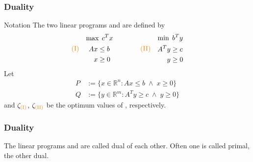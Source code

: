 
\begin{frame}
    \frametitle{Duality}
    \begin{block}{Notation}
        The two linear programs \text{\textcolor{orange}{(I)}} and \text{\textcolor{orange}{(II)}} are defined by
        \begin{equation*}
            \text{\textcolor{orange}{(I)}} \quad
            \begin{gathered}
                \max \; c^T x \\
                \begin{aligned}
                    Ax & \leq b \\
                    x & \geq 0
                \end{aligned}
            \end{gathered}
            \qquad \qquad
            \text{\textcolor{orange}{(II)}} \quad
            \begin{gathered}
                \min \; b^T y \\
                \begin{aligned}
                    A^T y & \geq c \\
                    y & \geq 0
                \end{aligned}
            \end{gathered}
        \end{equation*}
        Let
        \begin{align*}
            P & := \{x \in \mathbb{R}^n: Ax \leq b \; \land \; x \geq 0 \} \\
            Q & := \{y \in \mathbb{R}^m: A^T y \geq c \; \land \; y \geq 0 \}
        \end{align*}
        and $\zeta_{\text{\textcolor{orange}{(I)}}}$, $\zeta_{\text{\textcolor{orange}{(II)}}}$ be the optimum values of \text{\textcolor{orange}{(I)}}, \text{\textcolor{orange}{(II)}} respectively.
    \end{block}
\end{frame}

\begin{frame}
    \frametitle{Duality}
    \begin{definition}
        The linear programs \text{\textcolor{orange}{(I)}} and \text{\textcolor{orange}{(II)}} are called \alert{dual} of each other. Often one is called \alert{primal}, the other \alert{dual}.
    \end{definition}
\end{frame}

